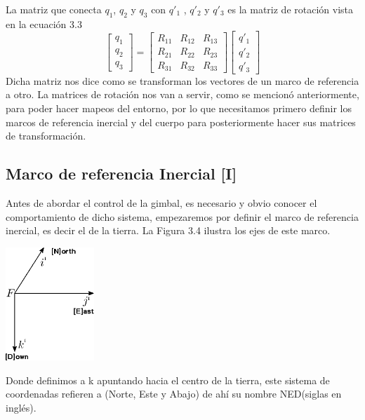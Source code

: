 La matriz que conecta $q_1$, $q_2$ y $q_3$ con $q'_1$ , $q'_2$ y $q'_3$ es la matriz de
rotación vista en la ecuación 3.3
\begin{equation}
	\begin{bmatrix}
		q_1 \\
		q_2 \\
		q_3
	\end{bmatrix}
	=
	\begin{bmatrix}
		R_{11} & R_{12} & R_{13} \\
		R_{21} & R_{22} & R_{23} \\
		R_{31} & R_{32} & R_{33}
	\end{bmatrix}
	\begin{bmatrix}
		q'_1 \\
		q'_2 \\
		q'_3
	\end{bmatrix}
\end{equation}
Dicha matriz nos dice como se transforman los vectores de un marco de referencia a otro. La matrices
de rotación nos van a servir, como se mencionó anteriormente, para poder hacer mapeos del entorno, por
lo que necesitamos primero definir los marcos de referencia inercial y del cuerpo para posteriormente
hacer sus matrices de transformación.

\subsection{Marco de referencia Inercial [I]}
Antes de abordar el control de la gimbal, es necesario y obvio conocer el comportamiento
de dicho sistema, empezaremos por definir el marco de referencia inercial, es decir
el de la tierra. La Figura 3.4 ilustra los ejes de este marco.
\begin{center}
	\includegraphics[width=0.25\textwidth]{Contenido/Cuerpo/Capitulo3/Fig4.eps}
	\label{fig:ModeloMat:Fig1}
\end{center}
Donde definimos a k apuntando hacia el centro de la tierra, este sistema de coordenadas
refieren a (Norte, Este y Abajo) de ahí su nombre NED(siglas en inglés).

